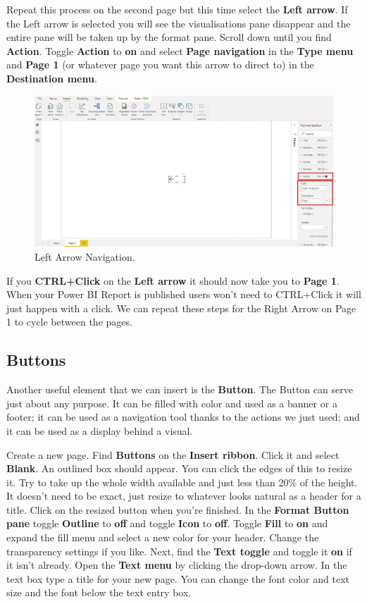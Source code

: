 \documentclass[
]{book}
\begin{document}
Repeat this process on the second page but this time select the \textbf{Left arrow}. If the Left arrow is selected you will see the visualisations pane disappear and the entire pane will be taken up by the format pane. Scroll down until you find \textbf{Action}. Toggle \textbf{Action} to \textbf{on} and select \textbf{Page navigation} in the \textbf{Type menu} and \textbf{Page 1} (or whatever page you want this arrow to direct to) in the \textbf{Destination menu}.

\begin{figure}
\centering
\includegraphics{bi12.jpg}
\caption{Left Arrow Navigation.}
\end{figure}

If you \textbf{CTRL+Click} on the \textbf{Left arrow} it should now take you to \textbf{Page 1}. When your Power BI Report is published users won't need to CTRL+Click it will just happen with a click. We can repeat these steps for the Right Arrow on Page 1 to cycle between the pages.

\hypertarget{buttons}{%
\subsection{Buttons}\label{buttons}}

Another useful element that we can insert is the \textbf{Button}. The Button can serve just about any purpose. It can be filled with color and used as a banner or a footer; it can be used as a navigation tool thanks to the actions we just used; and it can be used as a display behind a visual.

Create a new page. Find \textbf{Buttons} on the \textbf{Insert ribbon}. Click it and select \textbf{Blank}. An outlined box should appear. You can click the edges of this to resize it. Try to take up the whole width available and just less than 20\% of the height. It doesn't need to be exact, just resize to whatever looks natural as a header for a title.
Click on the resized button when you're finished. In the \textbf{Format Button pane} toggle \textbf{Outline} to \textbf{off} and toggle \textbf{Icon} to \textbf{off}. Toggle \textbf{Fill} to \textbf{on} and expand the fill menu and select a new color for your header. Change the transparency settings if you like. Next, find the \textbf{Text toggle} and toggle it \textbf{on} if it isn't already. Open the \textbf{Text menu} by clicking the drop-down arrow. In the text box type a title for your new page. You can change the font color and text size and the font below the text entry box.
\end{document}
